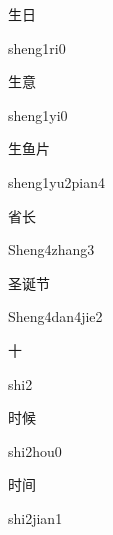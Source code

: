 \begin{multicols*}{2}
\begin{verbete}[sheng1ri0]{生日}
\begin{pronuncia}{sheng1ri0}
\end{pronuncia}
\end{verbete}

\begin{verbete}[sheng1yi0]{生意}
\begin{pronuncia}{sheng1yi0}
\end{pronuncia}
\end{verbete}

\begin{verbete}{生鱼片}
\begin{pronuncia}{sheng1yu2pian4}
\end{pronuncia}
\end{verbete}

\begin{verbete}{省长}
\begin{pronuncia}{Sheng4zhang3}
\end{pronuncia}
\end{verbete}

\begin{verbete}{圣诞节}
\begin{pronuncia}{Sheng4dan4jie2}
\end{pronuncia}
\end{verbete}

\begin{verbete}[shi2]{十}
\begin{pronuncia}{shi2}
\end{pronuncia}
\end{verbete}

\begin{verbete}{时候}
\begin{pronuncia}{shi2hou0}
\end{pronuncia}
\end{verbete}

\begin{verbete}{时间}
\begin{pronuncia}{shi2jian1}
\end{pronuncia}
\end{verbete}


\end{multicols*}
